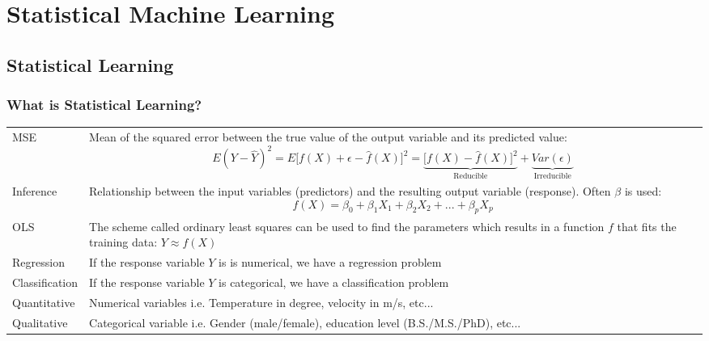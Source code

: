 \section{Statistical Machine Learning}
\subsection{Statistical Learning}
\subsubsection{What is Statistical Learning?}
\begin{onehalfspace}
	\begin{tabularx}{\textwidth}{p{3cm}X}
		MSE & Mean of the squared error between the true value of the output variable and its predicted value:
		\[ E(Y-\hat{Y})^2 = E\lbrack f(X)+\epsilon -\hat{f} (X)\rbrack ^2 = \underbrace{\lbrack f(X) -\hat{f} (X)\rbrack
			^2}_\text{Reducible} + \underbrace{Var(\epsilon ) }_\text{Irreducible} \] \\
		Inference &  Relationship between the input variables (predictors) and the resulting output variable (response).
		Often $\beta$ is used:
		\[ f(X) = \beta_0 + \beta_1 X_1 + \beta_2 X_2 + ... + \beta_p X_p \] \\
		OLS & The scheme called ordinary least squares can be used to find the parameters which results in a function $f$ that fits the training data: \( Y \approx{} f(X) \) \\
		Regression & If the response variable $Y$ is is numerical, we have a regression problem \\
		Classification & If the response variable $Y$ is categorical, we have a classification problem \\
		Quantitative & Numerical variables i.e. Temperature in degree, velocity in m/s, etc... \\
		Qualitative & Categorical variable i.e. Gender (male/female), education level (B.S./M.S./PhD), etc... \\
	\end{tabularx}
\end{onehalfspace}


